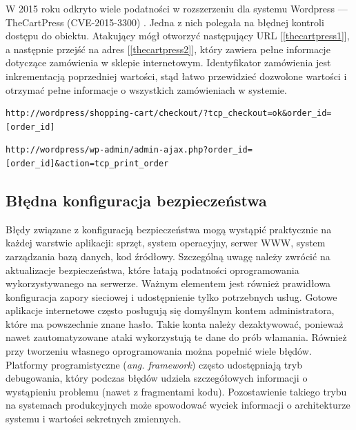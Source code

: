 \documentclass[11pt,a4paper,polish,thesis]{dcsbook}
\begin{document}
W 2015 roku odkryto wiele podatności w rozszerzeniu dla systemu Wordpress --- TheCartPress (CVE-2015-3300) \cite{thecartpress}. Jedna z nich polegała na błędnej kontroli dostępu do obiektu. Atakujący mógł otworzyć następujący URL [\ref{thecartpress1}], a następnie przejść na adres [\ref{thecartpress2}], który zawiera pełne informacje dotyczące zamówienia w sklepie internetowym. Identyfikator zamówienia jest inkrementacją poprzedniej wartości, stąd łatwo przewidzieć dozwolone wartości i otrzymać pełne informacje o wszystkich zamówieniach w systemie.

\begin{lstlisting}[caption=adres URL zamówienia w systemie TheCartPress,label=thecartpress1]
http://wordpress/shopping-cart/checkout/?tcp_checkout=ok&order_id=[order_id]
\end{lstlisting}

\begin{lstlisting}[caption=adres URL przeznaczony dla administratora do podglądu zamówienia,label=thecartpress2]
http://wordpress/wp-admin/admin-ajax.php?order_id=[order_id]&action=tcp_print_order
\end{lstlisting}


\subsection{Błędna konfiguracja bezpieczeństwa}
Błędy związane z konfiguracją bezpieczeństwa mogą wystąpić praktycznie na każdej warstwie aplikacji: sprzęt, system operacyjny, serwer WWW, system zarządzania bazą danych, kod źródłowy. Szczególną uwagę należy zwrócić na aktualizacje bezpieczeństwa, które łatają podatności oprogramowania wykorzystywanego na serwerze. Ważnym elementem jest również prawidłowa konfiguracja zapory sieciowej i udostępnienie tylko potrzebnych usług. Gotowe aplikacje internetowe często posługują się domyślnym kontem administratora, które ma powszechnie znane hasło. Takie konta należy dezaktywować, ponieważ nawet zautomatyzowane ataki wykorzystują te dane do prób włamania. Również przy tworzeniu własnego oprogramowania można popełnić wiele błędów. Platformy programistyczne (\textit{ang. framework}) często udostępniają tryb debugowania, który podczas błędów udziela szczegółowych informacji o wystąpieniu problemu (nawet z fragmentami kodu). Pozostawienie takiego trybu na systemach produkcyjnych może spowodować wyciek informacji o architekturze systemu i wartości sekretnych zmiennych.
\end{document}

